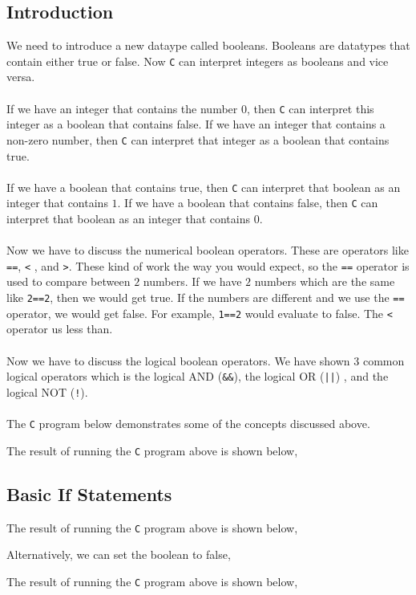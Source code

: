 \documentclass[a4paper, 12pt]{report}
\begin{document}
\begin{center}
\subsection{Introduction}
\begin{comment}
\end{comment}
We need to introduce a new dataype called booleans.
Booleans are datatypes that contain either true or false.
Now \texttt{C} can interpret integers as booleans and vice versa.
\\~\\If we have an integer that contains the number $0$, then \texttt{C} can interpret this integer as a boolean that contains false.
If we have an integer that contains a non-zero number, then \texttt{C} can interpret that integer as a boolean that contains true.
\\~\\If we have a boolean that contains true, then \texttt{C} can interpret that boolean as an integer that contains $1$.
If we have a boolean that contains false, then \texttt{C} can interpret that boolean as an integer that contains $0$.
\\~\\Now we have to discuss the numerical boolean operators. These are operators like \texttt{==}, \texttt{<} , and \texttt{>}.
These kind of work the way you would expect, so the \texttt{==} operator is used to compare between $2$ numbers.
If we have $2$ numbers which are the same like \texttt{2==2}, then we would get true.
If the numbers are different and we use the \texttt{==} operator, we would get false. 
For example, \texttt{1==2} would evaluate to false.
The \texttt{<} operator us less than.
\\~\\Now we have to discuss the logical boolean operators.
We have shown $3$ common logical operators which is the logical AND (\texttt{\&\&}), the logical OR (\texttt{||}) , and the logical NOT (\texttt{!}).
\\~\\The \texttt{C} program below demonstrates some of the concepts discussed above.

The result of running the \texttt{C} program above is shown below,


\subsection{Basic If Statements}
\begin{comment}
\end{comment}

The result of running the \texttt{C} program above is shown below,

Alternatively, we can set the boolean to false,

The result of running the \texttt{C} program above is shown below,




\end{center}
\end{document}
